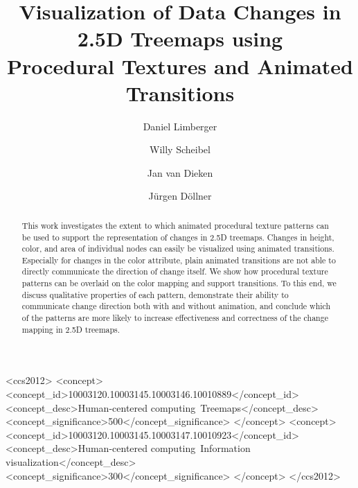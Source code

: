 \documentclass[sigconf%
,natbib=true%
]{acmart}
\begin{document}
\title[Visualization of Data Changes in 2.5D Treemaps using Procedural Textures and Animated Transitions]{Visualization of Data Changes in 2.5D Treemaps using\texorpdfstring{\\}{ }Procedural Textures and Animated Transitions}

\author{Daniel Limberger}
\author{Willy Scheibel}
\author{Jan van Dieken}
\author{J{\"u}rgen D{\"o}llner}

\renewcommand{\shortauthors}{D.~Limberger, W.~Scheibel, J.~v.~Dieken, J.~D{\"o}llner}

\begin{abstract}
    This work investigates the extent to which animated procedural texture patterns can be used to support the representation of changes in 2.5D treemaps.
    Changes in height, color, and area of individual nodes can easily be visualized using animated transitions.
    Especially for changes in the color attribute, plain animated transitions are not able to directly communicate the direction of change itself.
    We show how procedural texture patterns can be overlaid on the color mapping and support transitions.
    To this end, we discuss qualitative properties of each pattern, demonstrate their ability to communicate change direction both with and without animation, and conclude which of the patterns are more likely to increase effectiveness and correctness of the change mapping in 2.5D treemaps.
\end{abstract}

\begin{CCSXML}
	<ccs2012>
	<concept>
	<concept_id>10003120.10003145.10003146.10010889</concept_id>
	<concept_desc>Human-centered computing~Treemaps</concept_desc>
	<concept_significance>500</concept_significance>
	</concept>
	<concept>
	<concept_id>10003120.10003145.10003147.10010923</concept_id>
	<concept_desc>Human-centered computing~Information visualization</concept_desc>
	<concept_significance>300</concept_significance>
	</concept>
	</ccs2012>
\end{CCSXML}
\end{document}
